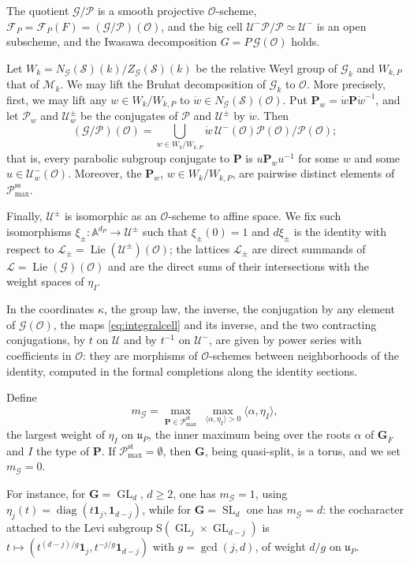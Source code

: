 \documentclass[11pt,reqno]{amsart}
\numberwithin{equation}{section}
\theoremstyle{plain}
\theoremstyle{definition}
\theoremstyle{remark}
\theoremstyle{plain}
\newcommand{\OO}{\mathcal{O}}    %
\newcommand{\Lat}{\mathcal{L}}   %
\newcommand{\Aff}{\mathbb{A}}    %
\newcommand{\bG}{\mathbf{G}}     %
\newcommand{\bP}{\mathbf{P}}     %
\newcommand{\g}{\mathfrak{g}}    %
\newcommand{\uu}{\mathfrak{u}}   %
\newcommand{\Pc}{\mathscr{P}^{\mathrm{st}}_{\mathrm{max}}}    %
\newcommand{\Pcss}{\mathscr{P}^{\mathrm{ss}}_{\mathrm{max}}}  %
\newcommand{\Fl}{\mathcal{F}}    %
\newcommand{\bFl}{\boldsymbol{\Fl}}  %
\newcommand{\cG}{\mathcal{G}}                   %
\newcommand{\cP}{\mathcal{P}}                   %
\newcommand{\cM}{\mathcal{M}}                   %
\newcommand{\cU}{\mathcal{U}}                   %
\newcommand{\cS}{\mathcal{S}}                   %
\newcommand{\one}{\mathbf{1}}
\DeclareMathOperator{\diag}{diag}
\DeclareMathOperator{\Lie}{Lie}
\DeclareMathOperator{\GL}{GL}
\DeclareMathOperator{\SL}{SL}
\begin{document}
The quotient
$\cG/\cP$ is a smooth projective $\OO$-scheme, $\Fl_P=\bFl_P(F)=(\cG/\cP)(\OO)$,
and the big cell $\cU^-\cP/\cP\simeq\cU^-$ is an open subscheme, and the Iwasawa decomposition $G=P\,\cG(\OO)$ holds.

Let $W_k=N_{\cG}(\cS)(k)/Z_{\cG}(\cS)(k)$ be the relative Weyl group of $\cG_k$ and $W_{k,P}$ that of $\cM_k$.
We may lift the Bruhat decomposition of $\cG_k$ to $\OO$.
More precisely, first, we may lift any $w\in W_k/W_{k,P}$ to $\dot w\in N_{\cG}(\cS)(\OO)$.
Put $\bP_w=\dot w\bP\dot w^{-1}$, and let $\cP_w$ and $\cU^\pm_w$ be the conjugates of $\cP$ and $\cU^\pm$ by $\dot w$. Then
\begin{equation}\label{eq:integralcover}
(\cG/\cP)(\OO)=\bigcup_{w\in W_k/W_{k,P}}\dot w\,\cU^-(\OO)\cP(\OO)/\cP(\OO);
\end{equation}
that is, every parabolic subgroup conjugate to $\bP$ is $u\bP_wu^{-1}$ for
some $w$ and some $u\in\cU^-_w(\OO)$. Moreover, the $\bP_w$,
$w\in W_k/W_{k,P}$, are pairwise distinct elements of $\Pcss$.

Finally, $\cU^\pm$ is isomorphic as an $\OO$-scheme to affine space.
We fix such isomorphisms $\xi_\pm:\Aff^{d_P}\to\cU^\pm$ such that $\xi_\pm(0)=1$ and $d\xi_\pm$ is the identity with
respect to $\Lat_\pm=\Lie(\cU^\pm)(\OO)$; the lattices $\Lat_\pm$
are direct summands of $\Lat=\Lie(\cG)(\OO)$ and are the direct sums
of their intersections with the weight spaces of $\eta_I$.

In the coordinates $\kappa$, the group law, the inverse, the conjugation by
any element of $\cG(\OO)$, the maps \eqref{eq:integralcell} and its inverse,
and the two contracting conjugations, by $t$ on $\cU$ and by $t^{-1}$ on
$\cU^-$, are given by power series with coefficients in $\OO$: they are
morphisms of $\OO$-schemes between neighborhoods of the identity, computed in
the formal completions along the identity sections.

Define
\begin{equation}\label{eq:mG}
m_{\cG}=\max_{\bP\in\Pc}\ \max_{\langle\alpha,\eta_I\rangle>0}\langle\alpha,\eta_I\rangle,
\end{equation}
the largest weight of $\eta_I$ on $\uu_P$, the inner maximum being over
the roots $\alpha$ of $\bG_{\bar F}$ and $I$ the type of $\bP$. If $\Pc=\emptyset$, then $\bG$, being quasi-split, is a torus, and we set $m_{\cG}=0$.

For instance, for $\bG=\GL_d$, $d\ge2$, one has $m_{\cG}=1$, using $\eta_j(t)=\diag(t\one_j,\one_{d-j})$,
while for $\bG=\SL_d$ one has $m_{\cG}=d$: the cocharacter attached to the Levi subgroup $\mathrm S(\GL_j\times\GL_{d-j})$
is $t\mapsto(t^{(d-j)/g}\one_j,t^{-j/g}\one_{d-j})$ with $g=\gcd(j,d)$, of weight $d/g$ on $\uu_P$.
\end{document}
